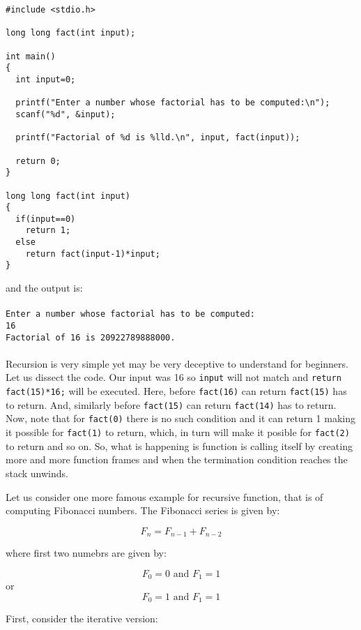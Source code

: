 \begin{verbatim}
#include <stdio.h>

long long fact(int input);

int main()
{
  int input=0;

  printf("Enter a number whose factorial has to be computed:\n");
  scanf("%d", &input);

  printf("Factorial of %d is %lld.\n", input, fact(input));

  return 0;
}

long long fact(int input)
{
  if(input==0)
    return 1;
  else
    return fact(input-1)*input;
}
\end{verbatim}
and the output is:
\\\\\texttt{Enter a number whose factorial has to be computed:\\
16\\
Factorial of 16 is 20922789888000.\\\\}
Recursion is very simple yet may be very deceptive to understand for
beginners. Let us dissect the code. Our input was 16 so \texttt{input} will not
match and \texttt{return fact(15)*16;} will be executed. Here, before
\texttt{fact(16)} can return \texttt{fact(15)} has to return. And, similarly
before \texttt{fact(15)} can return \texttt{fact(14)} has to return. Now, note
that for \texttt{fact(0)} there is no such condition and it can return 1 making
it possible for \texttt{fact(1)} to return, which, in turn will make it posible
for \texttt{fact(2)} to return and so on. So, what is happening is function is
calling itself by creating more and more function frames and when the
termination condition reaches the stack unwinds.

Let us consider one more famous example for recursive function, that is of
computing Fibonacci numbers. The Fibonacci series is given by:

$$F_n = F_{n-1} + F_{n-2}$$

where first two numebrs are given by:

$$ F_0 = 0 \text{~and~} F_1 = 1$$ or
$$ F_0 = 1 \text{~and~} F_1 = 1$$

First, consider the iterative version:
